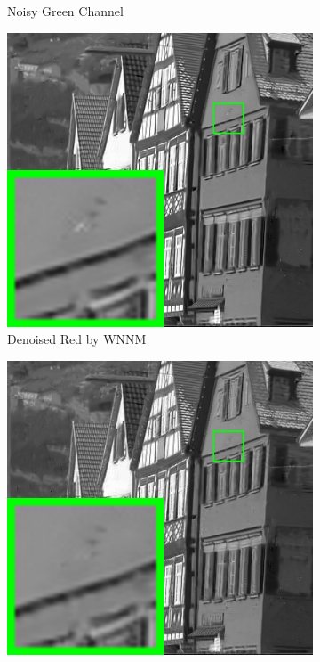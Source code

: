 \begin{figure}
\begin{subfigure}[t]{0.24\textwidth}
\caption{Noisy Green Channel}
    \end{subfigure}
    \hfill
    \begin{subfigure}[t]{0.24\textwidth}
        \centering
        \includegraphics[width=1\textwidth]{images/mcwnnm/br_WNNMJ_nSig402030_lambda1_kodim08_1.png}
\caption{Denoised Red by WNNM}
    \end{subfigure}
\hfill
    \begin{subfigure}[t]{0.24\textwidth}
        \centering
        \includegraphics[width=1\textwidth]{images/mcwnnm/br_CWNNM_ADMM_nSig402030_kodim08_1.png}

\end{subfigure}
\end{figure}
